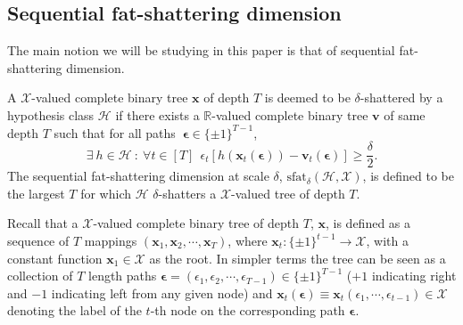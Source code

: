\subsection{Sequential fat-shattering dimension}

The main notion we will be studying in this paper is that of sequential fat-shattering dimension. 

\begin{definition}

A $\mathcal{X}$-valued complete binary tree $\mathbf{x}$ of depth $T$ is deemed to be $\delta$-shattered by a hypothesis class $\mathcal{H}$ if there exists a $\mathbb{R}$-valued complete binary tree $\mathbf{v}$ of same depth $T$ such that for all paths $\ \boldsymbol{\epsilon} \in \{\pm 1\}^{T-1}$,
\begin{equation*}
     \exists \ h \in \mathcal{H} \ : \ \forall t \in [T] \ \ \epsilon_t [h(\mathbf{x}_t(\boldsymbol{\epsilon})) - \mathbf{v}_t (\boldsymbol{\epsilon})] \geq \frac{\delta}{2}.
\end{equation*}
The sequential fat-shattering dimension at scale $\delta$, $\text{sfat}_\delta (\mathcal{H}, \mathcal{X})$, is defined to be the largest $T$ for which $\mathcal{H}$ $\delta$-shatters a $\mathcal{X}$-valued tree of depth $T$.
\end{definition}
Recall that a $\mathcal{X}$-valued complete binary tree of depth $T$, $\mathbf{x}$, is defined as a sequence of $T$ mappings $(\mathbf{x}_1, \mathbf{x}_2, \cdots, \mathbf{x}_T)$, where $\mathbf{x}_t: \{\pm 1\}^{t-1} \rightarrow \mathcal{X}$, with a constant function $\mathbf{x}_1 \in \mathcal{X}$ as the root. In simpler terms the tree can be seen as a collection of $T$ length paths $\boldsymbol{\epsilon} = (\epsilon_1, \epsilon_2, \cdots, \epsilon_{T-1}) \in \{\pm1\}^{T-1}$ ($+1$ indicating right and $-1$ indicating left from any given node) and $\mathbf{x}_t(\boldsymbol{\epsilon}) \equiv \mathbf{x}_t (\epsilon_1, \cdots, \epsilon_{t-1}) \in \mathcal{X}$ denoting the label of the $t$-th node on the corresponding path $\mathbf{\epsilon}$. 

